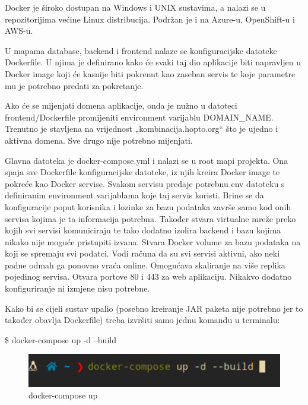 		Docker je široko dostupan na Windows i UNIX sustavima, a nalazi se u repozitorijima većine Linux distribucija. Podržan je i na Azure-u, OpenShift-u i AWS-u.\\
		
		
		
	
		U mapama database, backend i frontend nalaze se konfiguracijske datoteke Dockerfile. U njima je definirano kako će svaki taj dio aplikacije biti napravljen u Docker image koji će kasnije biti pokrenut kao zaseban servis te koje parametre mu je potrebno predati za pokretanje. 
			
			Ako će se mijenjati domena aplikacije, onda je nužno u datoteci frontend/Dockerfile promijeniti environment varijablu DOMAIN\_NAME. Trenutno je stavljena na vrijednost „kombinacija.hopto.org“ što je ujedno i aktivna domena. Sve drugo nije potrebno mijenjati.
			
			Glavna datoteka je docker-compose.yml i nalazi se u root mapi projekta. Ona spaja sve Dockerfile konfiguracijske datoteke, iz njih kreira Docker image te pokreće kao Docker servise. Svakom servisu predaje potrebnu env datoteku s definiranim environment varijablama koje taj servis koristi. Brine se da konfiguracije poput korisnika i lozinke za bazu podataka završe samo kod onih servisa kojima je ta informacija potrebna. Također stvara virtualne mreže preko kojih svi servisi komuniciraju te tako dodatno izolira backend i bazu kojima nikako nije moguće pristupiti izvana. Stvara Docker volume za bazu podataka na koji se spremaju svi podatci. Vodi računa da su svi servisi aktivni, ako neki padne odmah ga ponovno vraća online. Omogućava skaliranje na više replika pojedinog servisa. Otvara portove 80 i 443 za web aplikaciju. Nikakvo dodatno konfiguriranje ni izmjene nisu potrebne.
	
		Kako bi se cijeli sustav upalio (posebno kreiranje JAR paketa nije potrebno jer to također obavlja Dockerfile) treba izvršiti samo jednu komandu u terminalu:
		
		\$ docker-compose up -d --build
		
		\begin{figure}[H]
					\includegraphics[scale=0.5]{figures/terminl_1.PNG}
					\centering
					\caption{docker-compose up}
					\label{fig:sekv-uc13}
				\end{figure}
				
